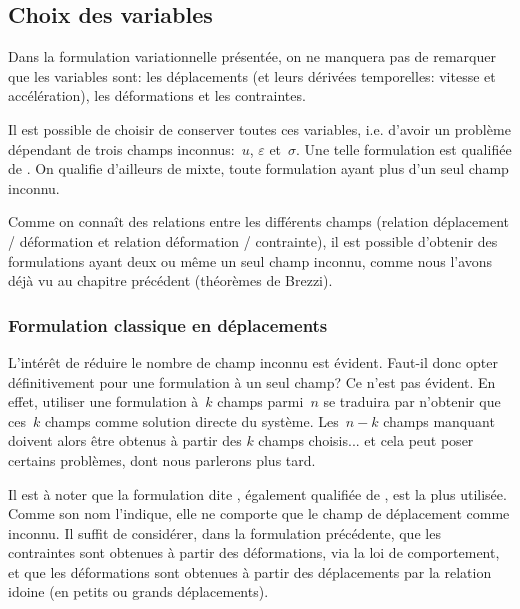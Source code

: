 \medskip
\subsection{Choix des variables}\label{Sec-form}

Dans la formulation variationnelle présentée, on ne manquera pas de remarquer
que les variables sont: les déplacements (et leurs dérivées temporelles: vitesse et accélération),
les déformations et les contraintes.

Il est possible de choisir de conserver toutes ces variables, i.e. d'avoir un problème
dépendant de trois champs inconnus:~$u$, $\varepsilon$ et~$\sigma$.
Une telle formulation est qualifiée de .
On qualifie d'ailleurs de mixte, toute formulation ayant plus d'un seul champ inconnu.

Comme on connaît des relations entre les différents champs (relation déplacement /
déformation et relation déformation / contrainte), il est possible
d'obtenir des formulations ayant deux ou même un seul champ inconnu, comme
nous l'avons déjà vu au chapitre précédent (théorèmes de Brezzi).

\medskip
\subsubsection{Formulation classique en déplacements}
L'intérêt de réduire le nombre de champ inconnu est évident.
Faut-il donc opter définitivement pour une formulation à un seul champ?
Ce n'est pas évident. En effet, utiliser une formulation à~$k$ champs parmi~$n$
se traduira par n'obtenir que ces~$k$ champs comme solution directe du
système. Les~$n-k$ champs manquant doivent alors être obtenus à partir des
$k$ champs choisis... et cela peut poser certains problèmes, dont nous parlerons plus tard.

Il est à noter que la formulation dite , également
qualifiée de , est la plus utilisée. Comme son nom
l'indique, elle ne comporte que le champ de déplacement comme inconnu.
Il suffit de considérer, dans la formulation précédente, que les contraintes
sont obtenues à partir des déformations, via la loi de comportement, et que
les déformations sont obtenues à partir des déplacements par la relation
idoine (en petits ou grands déplacements).

